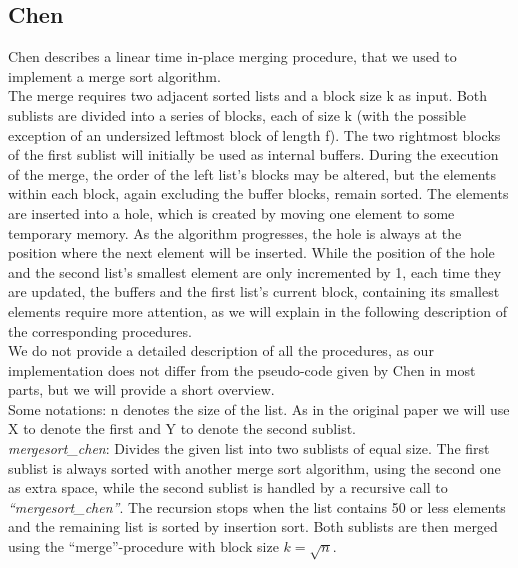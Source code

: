 \documentclass[11pt,pdftex,a4paper, twocolumn]{article}
\begin{document}
\subsection*{Chen}
Chen describes a linear time in-place merging procedure, that we used to implement a merge sort algorithm. \\
The merge requires two adjacent sorted lists and a block size k as input. Both sublists are divided into a series of blocks, each of size k (with the possible exception of an undersized leftmost block of length f). The two rightmost blocks of the first sublist will initially be used as internal buffers. During the execution of the merge, the order of the left list's blocks may be altered, but the elements within each block, again excluding the buffer blocks, remain sorted. The elements are inserted into a hole, which is created by moving one element to some temporary memory. As the algorithm progresses, the hole is always at the position where the next element will be inserted. While the position of the hole and the second list’s smallest element are only incremented by 1, each time they are updated, the buffers and the first list’s current block, containing its smallest elements require more attention, as we will explain in the following description of the corresponding procedures. \\
We do not provide a detailed description of all the procedures, as our implementation does not differ from the pseudo-code given by Chen in most parts, but we will provide a short overview. \\
Some notations: n denotes the size of the list. As in the original paper we will use X to denote the first and Y to denote the second sublist. \\
\textit{mergesort\_chen}: Divides the given list into two sublists of equal size. The first sublist is always sorted with another merge sort algorithm, using the second one as extra space, while the second sublist is handled by a recursive call to \textit{“mergesort\_chen”}. The recursion stops when the list contains 50 or less elements and the remaining list is sorted by insertion sort.  Both sublists are then merged using the “merge”-procedure with block size $k=\sqrt{n}$. \\
\end{document}
